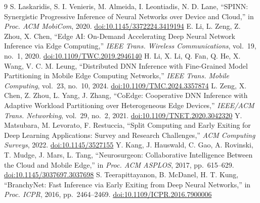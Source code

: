 \documentclass[10pt,a4paper]{article}
\newcommand{\doi}[1]{\href{https://doi.org/#1}{\color{accent}doi:#1}}
\begin{document}
{\scriptsize
\renewcommand{\refname}{References}
\begin{thebibliography}{9}\setlength{\itemsep}{0pt}\setlength{\parskip}{0pt}
 S. Laskaridis, S. I. Venieris, M. Almeida, I. Leontiadis, N. D. Lane, ``SPINN: Synergistic Progressive Inference of Neural Networks over Device and Cloud,'' in \emph{Proc. ACM MobiCom}, 2020. \doi{10.1145/3372224.3419194}
 E. Li, L. Zeng, Z. Zhou, X. Chen, ``Edge AI: On-Demand Accelerating Deep Neural Network Inference via Edge Computing,'' \emph{IEEE Trans. Wireless Communications}, vol.~19, no.~1, 2020. \doi{10.1109/TWC.2019.2946140}
 H. Li, X. Li, Q. Fan, Q. He, X. Wang, V. C. M. Leung, ``Distributed DNN Inference with Fine-Grained Model Partitioning in Mobile Edge Computing Networks,'' \emph{IEEE Trans. Mobile Computing}, vol.~23, no.~10, 2024. \doi{10.1109/TMC.2024.3357874}
 L. Zeng, X. Chen, Z. Zhou, L. Yang, J. Zhang, ``CoEdge: Cooperative DNN Inference with Adaptive Workload Partitioning over Heterogeneous Edge Devices,'' \emph{IEEE/ACM Trans. Networking}, vol.~29, no.~2, 2021. \doi{10.1109/TNET.2020.3042320}
 Y. Matsubara, M. Levorato, F. Restuccia, ``Split Computing and Early Exiting for Deep Learning Applications: Survey and Research Challenges,'' \emph{ACM Computing Surveys}, 2022. \doi{10.1145/3527155}
 Y. Kang, J. Hauswald, C. Gao, A. Rovinski, T. Mudge, J. Mars, L. Tang, ``Neurosurgeon: Collaborative Intelligence Between the Cloud and Mobile Edge,'' in \emph{Proc. ACM ASPLOS}, 2017, pp.~615--629. \doi{10.1145/3037697.3037698}
 S. Teerapittayanon, B. McDanel, H. T. Kung, ``BranchyNet: Fast Inference via Early Exiting from Deep Neural Networks,'' in \emph{Proc. ICPR}, 2016, pp.~2464--2469. \doi{10.1109/ICPR.2016.7900006}
\end{thebibliography}}
\end{document}
